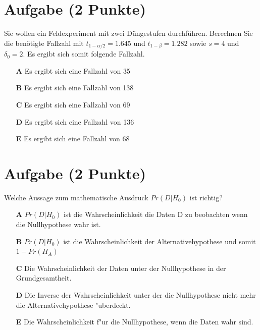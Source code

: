 \documentclass[a4paper, 10pt]{scrartcl}\usepackage[]{graphicx}\usepackage[]{xcolor}
\begin{document}
\section{Aufgabe \hfill (2 Punkte)}




Sie wollen ein Feldexperiment mit zwei D{\"u}ngestufen durchf{\"u}hren. Berechnen
Sie die ben{\"o}tigte Fallzahl mit $t_{1-\alpha/2} = 1.645$ und
$t_{1-\beta} = 1.282$ sowie $s = 4$ und
$\delta_0 = 2$. Es ergibt sich somit folgende Fallzahl.



\begin{enumerate}
\item [\textbf{A} \msquare] Es ergibt sich eine Fallzahl von 35
\item [\textbf{B} \msquare] Es ergibt sich eine Fallzahl von 138
\item [\textbf{C} \msquare] Es ergibt sich eine Fallzahl von 69
\item [\textbf{D} \msquare] Es ergibt sich eine Fallzahl von 136
\item [\textbf{E} \msquare] Es ergibt sich eine Fallzahl von 68
\end{enumerate}

\section{Aufgabe \hfill (2 Punkte)}

Welche Aussage zum mathematische Ausdruck $Pr(D|H_0)$ ist richtig? 



\begin{enumerate}
\item [\textbf{A} \msquare] $Pr(D|H_0)$ ist die Wahrscheinlichkeit die Daten D zu beobachten wenn die Nullhypothese wahr ist.
\item [\textbf{B} \msquare] $Pr(D|H_0)$ ist die Wahrscheinlichkeit der Alternativehypothese und somit $1 - Pr(H_A)$
\item [\textbf{C} \msquare] Die Wahrscheinlichkeit der Daten unter der Nullhypothese in der Grundgesamtheit.
\item [\textbf{D} \msquare] Die Inverse der Wahrscheinlichkeit unter der die Nullhypothese nicht mehr die Alternativehypothese {"u}berdeckt.
\item [\textbf{E} \msquare] Die Wahrscheinlichkeit f{"u}r die Nullhypothese, wenn die Daten wahr sind.
\end{enumerate}
\end{document}
